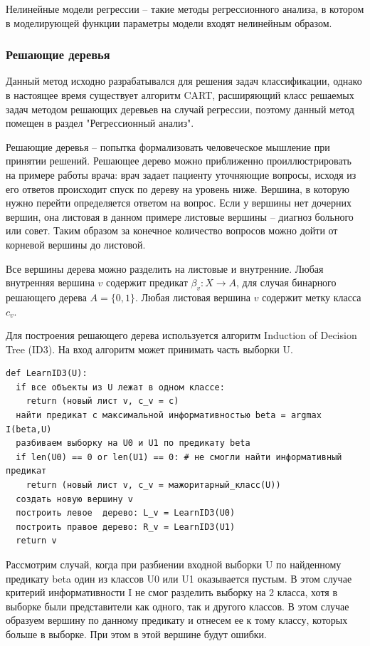 Нелинейные модели регрессии -- такие методы регрессионного анализа, в котором в моделирующей функции параметры модели входят нелинейным образом.


\subsubsection{Решающие деревья}

Данный метод исходно разрабатывался для решения задач классификации, однако в настоящее время существует алгоритм CART, расширяющий класс решаемых задач методом решающих деревьев на случай регрессии, поэтому данный метод помещен в раздел "Регрессионный анализ".

Решающие деревья -- попытка формализовать человеческое мышление при принятии решений. Решающее дерево можно приближенно проиллюстрировать на примере работы врача: врач задает пациенту уточняющие вопросы, исходя из его ответов происходит спуск по дереву на уровень ниже. Вершина, в которую нужно перейти определяется ответом на вопрос. Если у вершины нет дочерних вершин, она листовая в данном примере листовые вершины -- диагноз больного или совет. Таким образом за конечное количество вопросов можно дойти от корневой вершины до листовой.

Все вершины дерева можно разделить на листовые и внутренние. Любая внутренняя вершина $v$ содержит предикат $\beta_v : X \rightarrow A$, для случая бинарного решающего дерева $A = \{0, 1\}$. Любая листовая вершина $v$ содержит метку класса $c_v$.

Для построения решающего дерева используется алгоритм Induction of Decision Tree (ID3). На вход алгоритм может принимать часть выборки U.

\begin{code}
\begin{verbatim}
def LearnID3(U):
  if все объекты из U лежат в одном классе:
    return (новый лист v, c_v = c)
  найти предикат с максимальной информативностью beta = argmax I(beta,U)
  разбиваем выборку на U0 и U1 по предикату beta
  if len(U0) == 0 or len(U1) == 0: # не смогли найти информативный предикат
    return (новый лист v, c_v = мажоритарный_класс(U))
  создать новую вершину v
  построить левое  дерево: L_v = LearnID3(U0)
  построить правое дерево: R_v = LearnID3(U1)
  return v
\end{verbatim}
\label{code:ID3}
\end{code}


Рассмотрим случай, когда при разбиении входной выборки U по найденному предикату beta один из классов U0 или U1 оказывается пустым. В этом случае критерий информативности I не смог разделить выборку на 2 класса, хотя в выборке были представители как одного, так и другого классов. В этом случае образуем вершину по данному предикату и отнесем ее к тому классу, которых больше в выборке. При этом в этой вершине будут ошибки.

